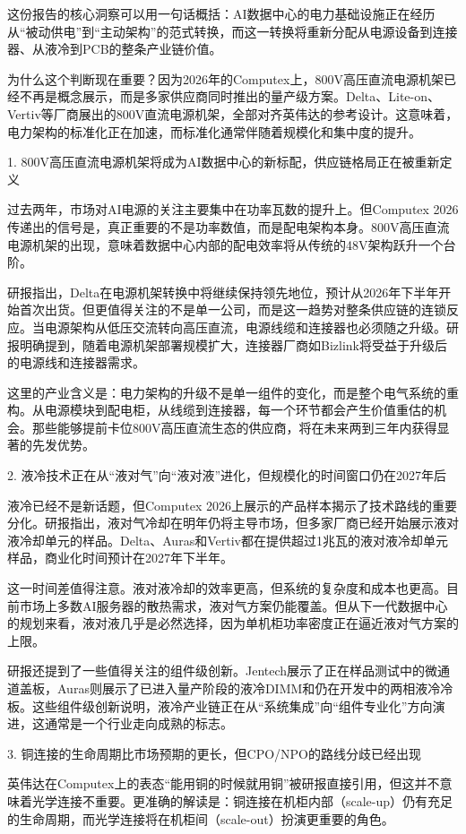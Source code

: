 \documentclass[11pt]{ctexart}
\begin{document}
这份报告的核心洞察可以用一句话概括：AI数据中心的电力基础设施正在经历从“被动供电”到“主动架构”的范式转换，而这一转换将重新分配从电源设备到连接器、从液冷到PCB的整条产业链价值。

为什么这个判断现在重要？因为2026年的Computex上，800V高压直流电源机架已经不再是概念展示，而是多家供应商同时推出的量产级方案。Delta、Lite-on、Vertiv等厂商展出的800V直流电源机架，全部对齐英伟达的参考设计。这意味着，电力架构的标准化正在加速，而标准化通常伴随着规模化和集中度的提升。

1. 800V高压直流电源机架将成为AI数据中心的新标配，供应链格局正在被重新定义

过去两年，市场对AI电源的关注主要集中在功率瓦数的提升上。但Computex 2026传递出的信号是，真正重要的不是功率数值，而是配电架构本身。800V高压直流电源机架的出现，意味着数据中心内部的配电效率将从传统的48V架构跃升一个台阶。

研报指出，Delta在电源机架转换中将继续保持领先地位，预计从2026年下半年开始首次出货。但更值得关注的不是单一公司，而是这一趋势对整条供应链的连锁反应。当电源架构从低压交流转向高压直流，电源线缆和连接器也必须随之升级。研报明确提到，随着电源机架部署规模扩大，连接器厂商如Bizlink将受益于升级后的电源线和连接器需求。

这里的产业含义是：电力架构的升级不是单一组件的变化，而是整个电气系统的重构。从电源模块到配电柜，从线缆到连接器，每一个环节都会产生价值重估的机会。那些能够提前卡位800V高压直流生态的供应商，将在未来两到三年内获得显著的先发优势。

2. 液冷技术正在从“液对气”向“液对液”进化，但规模化的时间窗口仍在2027年后

液冷已经不是新话题，但Computex 2026上展示的产品样本揭示了技术路线的重要分化。研报指出，液对气冷却在明年仍将主导市场，但多家厂商已经开始展示液对液冷却单元的样品。Delta、Auras和Vertiv都在提供超过1兆瓦的液对液冷却单元样品，商业化时间预计在2027年下半年。

这一时间差值得注意。液对液冷却的效率更高，但系统的复杂度和成本也更高。目前市场上多数AI服务器的散热需求，液对气方案仍能覆盖。但从下一代数据中心的规划来看，液对液几乎是必然选择，因为单机柜功率密度正在逼近液对气方案的上限。

研报还提到了一些值得关注的组件级创新。Jentech展示了正在样品测试中的微通道盖板，Auras则展示了已进入量产阶段的液冷DIMM和仍在开发中的两相液冷冷板。这些组件级创新说明，液冷产业链正在从“系统集成”向“组件专业化”方向演进，这通常是一个行业走向成熟的标志。

3. 铜连接的生命周期比市场预期的更长，但CPO/NPO的路线分歧已经出现

英伟达在Computex上的表态“能用铜的时候就用铜”被研报直接引用，但这并不意味着光学连接不重要。更准确的解读是：铜连接在机柜内部（scale-up）仍有充足的生命周期，而光学连接将在机柜间（scale-out）扮演更重要的角色。
\end{document}
